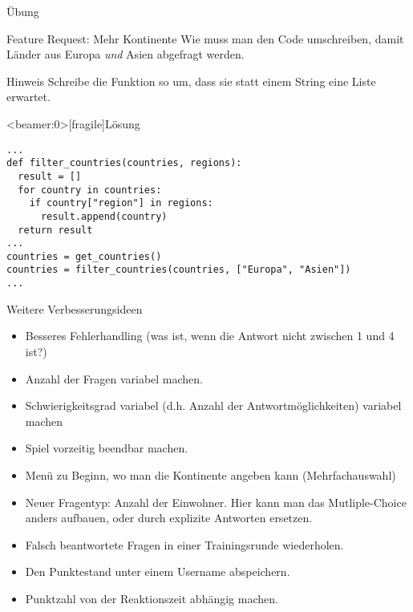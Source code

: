 \begin{frame}{Übung}
\begin{block}{Feature Request: Mehr Kontinente}
\vspace{2pt}
Wie muss man den Code umschreiben, damit Länder aus Europa \emph{und} Asien abgefragt werden.
\end{block}


\pause

\vspace{12pt}

\begin{exampleblock}{Hinweis}
	\vspace{2pt}
Schreibe die Funktion  so um, dass sie statt einem String  eine Liste  erwartet. 
\end{exampleblock}

\end{frame}

\begin{frame}<beamer:0>[fragile]{Lösung}
	
\begin{solutionblock}{}
\begin{verbatim}
...
def filter_countries(countries, regions):
  result = []
  for country in countries:
    if country["region"] in regions:
      result.append(country)
  return result
...
countries = get_countries()
countries = filter_countries(countries, ["Europa", "Asien"])
...
\end{verbatim}
\end{solutionblock}
\end{frame}


\begin{frame}
\begin{block}{Weitere Verbesserungsideen}
	\pause 
\begin{itemize}[<+->]
  \item Besseres Fehlerhandling (was ist, wenn die Antwort nicht zwischen 1 und 4 ist?)
  \item Anzahl der Fragen variabel machen. 
  \item Schwierigkeitsgrad variabel (d.h. Anzahl der Antwortmöglichkeiten) variabel machen
  \item Spiel vorzeitig beendbar machen. 
  \item Menü zu Beginn, wo man die Kontinente angeben kann (Mehrfachauswahl)
  \item Neuer Fragentyp: Anzahl der Einwohner. Hier kann man das Mutliple-Choice anders aufbauen, oder durch explizite Antworten ersetzen. 
  \item Falsch beantwortete Fragen in einer Trainingsrunde wiederholen.  
  \item Den Punktestand unter einem Username abspeichern.
  \item Punktzahl von der Reaktionszeit abhängig machen. 
\end{itemize}
\end{block}
\end{frame}